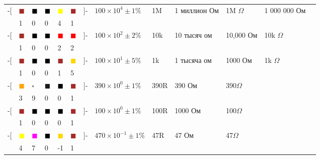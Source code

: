 \bigskip
\begin{tabular}{l l l l l l l l l l l l l}
-[&
\textcolor{Brown}{$\blacksquare$}&
\textcolor{Black}{$\blacksquare$}&
\textcolor{Black}{$\blacksquare$}&
\textcolor{Yellow}{$\blacksquare$}&
\textcolor{Brown}{$\blacksquare$}&
]- 
& $100\times 10^{4}\pm 1\%$ & 1M & 1 миллион Ом & 1M $\Omega$ & 1 000 000 Ом \\
&1&0&0&4&1\\
-[&
\textcolor{Brown}{$\blacksquare$}&
\textcolor{Black}{$\blacksquare$}&
\textcolor{Black}{$\blacksquare$}&
\textcolor{Red}{$\blacksquare$}&
\textcolor{Red}{$\blacksquare$}&
]- 
& $100\times 10^{2}\pm 2\%$ & 10k & 10 тысяч ом & 10,000 Ом & 10k $\Omega$ \\
&1&0&0&2&2\\
-[&
\textcolor{Brown}{$\blacksquare$}&
\textcolor{Black}{$\blacksquare$}&
\textcolor{Black}{$\blacksquare$}&
\textcolor{Brown}{$\blacksquare$}&
\textcolor{Gold}{$\blacksquare$}&
]- 
& $100\times 10^{1}\pm 5\%$ & 1k & 1 тысяча ом & 1000 Ом & 1k $\Omega$ \\
&1&0&0&1&5\\
-[&
\textcolor{Orange}{$\blacksquare$}&
$\square$&
$\blacksquare$&
\textcolor{Black}{$\blacksquare$}&
\textcolor{Brown}{$\blacksquare$}&
]- 
& $390\times 10^{0}\pm 1\%$ & 390R & 390 Ом & 390$\Omega$ \\
&3&9&0&0&1\\
-[&
\textcolor{Brown}{$\blacksquare$}&
\textcolor{Black}{$\blacksquare$}&
\textcolor{Black}{$\blacksquare$}&
\textcolor{Black}{$\blacksquare$}&
\textcolor{Brown}{$\blacksquare$}&
]- 
& $100\times 10^{0}\pm 1\%$ & 100R & 1000 Ом & 100$\Omega$ \\
&1&0&0&0&1\\
-[&
\textcolor{Yellow}{$\blacksquare$}&
\textcolor{Magenta}{$\blacksquare$}&
\textcolor{Black}{$\blacksquare$}&
\textcolor{Gold}{$\blacksquare$}&
\textcolor{Brown}{$\blacksquare$}&
]- 
& $470\times 10^{-1}\pm 1\%$ & 47R & 47 Ом & 47$\Omega$ \\
&4&7&0&-1&1\\
\end{tabular}

